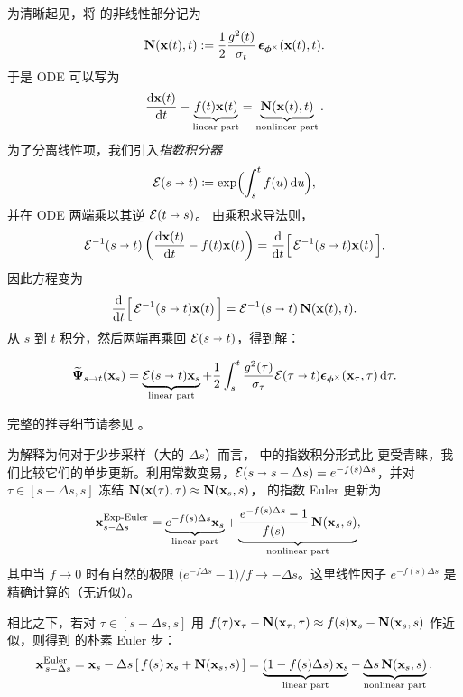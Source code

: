 为清晰起见，将  的非线性部分记为
\[
{\mathbf{N}}({\mathbf{x}}(t), t) := \frac{1}{2}\frac{g^2(t)}{\sigma_t}\,{\bm{\epsilon}}_{\bm{\phi}^\times}({\mathbf{x}}(t), t).
\]
于是 ODE 可以写为
\begin{align}\label{eq:general-semilinear-pfode}
    \frac{\mathop{}\!\mathrm{d} {\mathbf{x}}(t)}{\mathop{}\!\mathrm{d} t} - \underbrace{f(t){\mathbf{x}}(t)}_{\text{linear part}} = \underbrace{{\mathbf{N}}({\mathbf{x}}(t), t)}_{\text{nonlinear part}}.
\end{align}
为了分离线性项，我们引入\emph{指数积分器}
\[
\mathcal{E}(s \shortrightarrow t) \coloneqq \exp \Bigl(\int_s^t f(u) \mathop{}\!\mathrm{d} u\Bigr),
\]
并在 ODE 两端乘以其逆 $\mathcal{E}(t \shortrightarrow s)$。
由乘积求导法则，
\[
\mathcal{E}^{-1}(s \shortrightarrow t) \left(\frac{\mathop{}\!\mathrm{d} {\mathbf{x}}(t)}{\mathop{}\!\mathrm{d} t} - f(t){\mathbf{x}}(t)\right)
= \frac{\mathop{}\!\mathrm{d}}{\mathop{}\!\mathrm{d} t}\Big[\,\mathcal{E}^{-1}(s \shortrightarrow t){\mathbf{x}}(t)\,\Big].
\]
因此方程变为
\[
\frac{\mathop{}\!\mathrm{d}}{\mathop{}\!\mathrm{d} t}\Big[\,\mathcal{E}^{-1}(s \shortrightarrow t){\mathbf{x}}(t)\,\Big]
= \mathcal{E}^{-1}(s \shortrightarrow t)\,{\mathbf{N}}({\mathbf{x}}(t), t).
\]
从 $s$ 到 $t$ 积分，然后两端再乘回 $\mathcal{E}(s \shortrightarrow t)$，得到解：
\begin{mdframed}
    \begin{equation}\label{eq:variation_of_constants}
\widetilde{{\bm{\Psi}}}_{s\to t}({\mathbf{x}}_s)
= \underbrace{\mathcal{E}(s \shortrightarrow t){\mathbf{x}}_s}_{\text{linear part}}
+ \frac{1}{2}\int_s^t \frac{g^2(\tau)}{\sigma_\tau} 
\mathcal{E}(\tau \shortrightarrow t) 
{\bm{\epsilon}}_{\bm{\phi}^\times}({\mathbf{x}}_\tau,\tau) \mathop{}\!\mathrm{d}\tau.
\end{equation}
\end{mdframed}
完整的推导细节请参见 。

为解释为何对于少步采样（大的 $\Delta s$）而言， 中的指数积分形式比  更受青睐，我们比较它们的单步更新。利用常数变易，$\mathcal{E}(s\shortrightarrow s-\Delta s)=e^{-f(s)\Delta s}$，并对 $\tau\in[s-\Delta s,s]$ 冻结 ${\mathbf{N}}({\mathbf{x}}(\tau),\tau)\approx {\mathbf{N}}({\mathbf{x}}_s,s)$， 的指数 Euler 更新为
\begin{align}\label{eq:exp-euler-step}
&{\mathbf{x}}^{\mathrm{Exp}\text{-}\mathrm{Euler}}_{s-\Delta s}
= \underbrace{e^{-f(s)\Delta s}{\mathbf{x}}_s}_{\text{linear part}}
+\underbrace{\frac{e^{-f(s)\Delta s}-1}{f(s)}\,{\mathbf{N}}({\mathbf{x}}_s,s)}_{\text{nonlinear part}},
\end{align}
其中当 $f\to 0$ 时有自然的极限 $\bigl(e^{-f\Delta s}-1\bigr)/f\to -\Delta s$。这里线性因子 $e^{-f(s)\Delta s}$ 是精确计算的（无近似）。

相比之下，若对 $\tau\in[s-\Delta s,s]$ 用 $f(\tau){\mathbf{x}}_\tau - {\mathbf{N}}({\mathbf{x}}_\tau,\tau)\approx f(s){\mathbf{x}}_s - {\mathbf{N}}({\mathbf{x}}_s,s)$ 作近似，则得到  的朴素 Euler 步：
\begin{align}\label{eq:euler-step}
  {\mathbf{x}}^{\mathrm{Euler}}_{\,s-\Delta s}
={\mathbf{x}}_s-\Delta s\,[\,f(s)\,{\mathbf{x}}_s+{\mathbf{N}}({\mathbf{x}}_s,s)\,]
=\underbrace{(1-f(s)\Delta s)\,{\mathbf{x}}_s}_{\text{linear part}}
-\underbrace{\Delta s\,{\mathbf{N}}({\mathbf{x}}_s,s)}_{\text{nonlinear part}}. 
\end{align}


